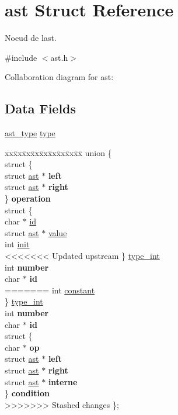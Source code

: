 \hypertarget{structast}{}\section{ast Struct Reference}
\label{structast}


Noeud de l\textquotesingle{}ast.  




{\ttfamily \#include $<$ast.\+h$>$}



Collaboration diagram for ast\+:
\subsection*{Data Fields}
\begin{DoxyCompactItemize}
\item 
\hyperlink{ast_8h_a77091c187ac9a89404fac2e8226daef3}{ast\+\_\+type} \hyperlink{structast_a8321fc8e556a418583dd74ee9fcc2bf7}{type}
\item 
\mbox{\label{structast_aa607c7a27d555cb2310d47623165269a}} 
\begin{tabbing}
xx\=xx\=xx\=xx\=xx\=xx\=xx\=xx\=xx\=\kill
union \{\\
\>struct \{\\
\>\>struct \hyperlink{structast}{ast} $\ast$ {\bfseries left}\\
\>\>struct \hyperlink{structast}{ast} $\ast$ {\bfseries right}\\
\>\} {\bfseries operation}\\
\>struct \{\\
\>\>char $\ast$ \hyperlink{structast_aecb3b0d045ada529257a2fbf8f829599}{id}\\
\>\>struct \hyperlink{structast}{ast} $\ast$ \hyperlink{structast_a0547e48c9f9ecb35c94f988890f217b7}{value}\\
\>\>int \hyperlink{structast_a795ea50921b36311ffd5e7baa2ef1f7e}{init}\\
<<<<<<< Updated upstream
\>\} \hyperlink{structast_a48c1fea64ccd73c68d3901c23d65f9f5}{type\_int}\\
\>int {\bfseries number}\\
\>char $\ast$ {\bfseries id}\\
=======
\>\>int \hyperlink{structast_ac347bb44c6dc857729453831c5714f84}{constant}\\
\>\} \hyperlink{structast_a48c1fea64ccd73c68d3901c23d65f9f5}{type\_int}\\
\>int {\bfseries number}\\
\>char $\ast$ {\bfseries id}\\
\>struct \{\\
\>\>char $\ast$ {\bfseries op}\\
\>\>struct \hyperlink{structast}{ast} $\ast$ {\bfseries left}\\
\>\>struct \hyperlink{structast}{ast} $\ast$ {\bfseries right}\\
\>\>struct \hyperlink{structast}{ast} $\ast$ {\bfseries interne}\\
\>\} {\bfseries condition}\\
>>>>>>> Stashed changes
\}; \\


\end{tabbing}
\end{DoxyCompactItemize}
